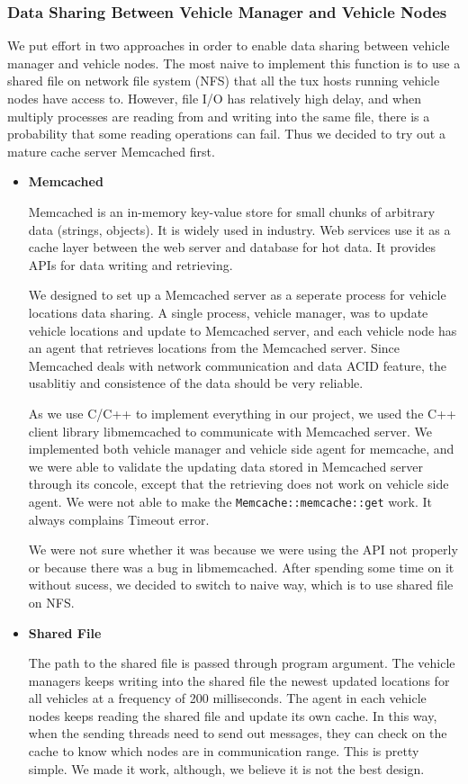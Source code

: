 \documentclass[twocolumn]{article}
\begin{document}
    \subsubsection{Data Sharing Between Vehicle Manager and Vehicle Nodes}
    \par{We put effort in two approaches in order to enable data sharing between vehicle manager and vehicle nodes. The most naive to implement this function is to use a shared file on network file system (NFS) that all the tux hosts running vehicle nodes have access to. However, file I/O has relatively high delay, and when multiply processes are reading from and writing into the same file, there is a probability that some reading operations can fail. Thus we decided to try out a mature cache server Memcached first.}
    \begin{itemize}
    \item {\bf Memcached}
    \par{Memcached is an in-memory key-value store for small chunks of arbitrary data (strings, objects). It is widely used in industry. Web services use it as a cache layer between the web server and database for hot data. It provides APIs for data writing and retrieving.}
    \par{We designed to set up a Memcached server as a seperate process for vehicle locations data sharing. A single process, vehicle manager, was to update vehicle locations and update to Memcached server, and each vehicle node has an agent that retrieves locations from the Memcached server. Since Memcached deals with network communication and data ACID feature, the usablitiy and consistence of the data should be very reliable.}
    \par{As we use C/C++ to implement everything in our project, we used the C++ client library libmemcached to communicate with Memcached server. We implemented both vehicle manager and vehicle side agent for memcache, and we were able to validate the updating data stored in Memcached server through its concole, except that the retrieving does not work on vehicle side agent. We were not able to make the {\tt Memcache::memcache::get} work. It always complains Timeout error.}
    \par{We were not sure whether it was because we were using the API not properly or because there was a bug in libmemcached. After spending some time on it without sucess, we decided to switch to naive way, which is to use shared file on NFS.}
    \item {\bf Shared File}
    \label{sec:sharedfile}
    \par{The path to the shared file is passed through program argument. The vehicle managers keeps writing into the shared file the newest updated locations for all vehicles at a frequency of 200 milliseconds. The agent in each vehicle nodes keeps reading the shared file and update its own cache. In this way, when the sending threads need to send out messages, they can check on the cache to know which nodes are in communication range. This is pretty simple. We made it work, although, we believe it is not the best design.}
    \end{itemize}
\end{document}
